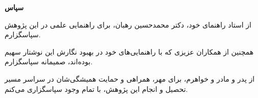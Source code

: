 \begin{center}\textbf{سپاس}\end{center}
از استاد راهنمای خود، دکتر محمدحسین رهبان، برای راهنمایی علمی در این پژوهش سپاسگزارم.

همچنین از همکاران عزیزی که با راهنمایی‌های خود در بهبود نگارش این نوشتار سهیم بوده‌اند، صمیمانه سپاسگزارم.

از پدر و مادر و خواهرم، برای مهر، همراهی و حمایت همیشگی‌شان در سراسر مسیر تحصیل و انجام این پژوهش، با تمام وجود سپاسگزاری می‌کنم.
